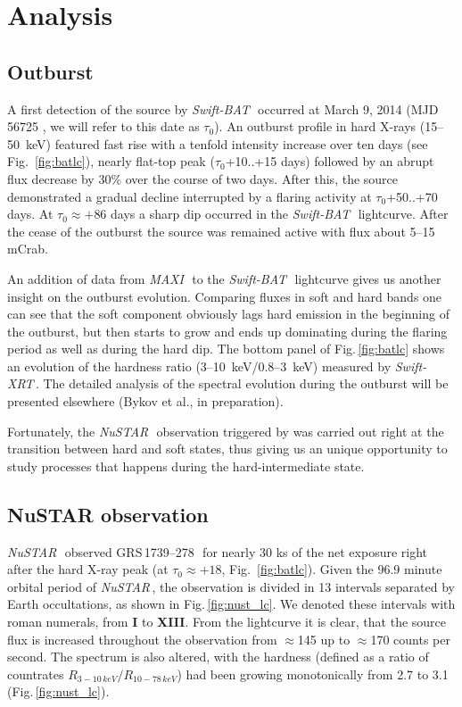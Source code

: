 \documentclass[a4paper,fleqn,usenatbib]{mnras}
\def\grs{{GRS\,1739--278\,}}
\def\swiftx{{\em Swift-XRT\,}}
\def\swiftb{{\em Swift-BAT\,}}
\def\nustar{{\em NuSTAR\,}}
\def\maxi{{\em MAXI\,}}
\begin{document}
\section{Analysis}
\subsection{Outburst}
A first detection of the source by \swiftb\, occurred at March 9, 2014 (MJD 56725 \citep{krimm14_atel}, we will refer to this date as $\tau_{0}$). 
An outburst profile in hard X-rays (15--50~keV) featured fast rise with a tenfold intensity increase over ten days (see Fig.~\ref{fig:batlc}), nearly flat-top peak ($\tau_{0}$+10..+15 days) followed by an abrupt flux decrease by 30\% over the course of two days.
After this, the source demonstrated a gradual decline interrupted by a flaring activity at $\tau_{0}$+50..+70 days. 
At $\tau_{0} \approx +86$ days a sharp dip occurred in the \swiftb\ lightcurve. 
After the cease of the outburst the source was remained active with flux about 5--15 mCrab. 

An addition of data from \maxi\, to the \swiftb\, lightcurve gives us another insight on the outburst evolution. 
Comparing fluxes in soft and hard bands one can see that the soft component obviously lags hard emission in the beginning of the outburst, but then starts to grow and ends up dominating during the flaring period as well as during the hard dip. 
The bottom panel of Fig.\,\ref{fig:batlc} shows an evolution of the hardness ratio (3--10~keV/0.8--3~keV) measured by \swiftx. 
The detailed analysis of the spectral evolution during the outburst will be presented elsewhere (Bykov et al., in preparation).

Fortunately, the \nustar\ observation triggered by \cite{miller15_nust} was carried out right at the transition between hard and soft states, thus giving us an unique opportunity to study processes that happens during the hard-intermediate state. 


\subsection{NuSTAR observation}
\label{sec:nust} 

\nustar\, observed \grs\ for nearly 30 ks of the net exposure right after the hard X-ray peak (at $\tau_{0}\approx+18$, Fig.~\ref{fig:batlc}). 
Given the 96.9 minute orbital period of \nustar, the observation is divided in 13 intervals separated by Earth occultations, as shown in Fig.\,\ref{fig:nust_lc}. 
We denoted these intervals with roman numerals, from {\bf I} to {\bf XIII}. 
From the lightcurve it is clear, that the source flux is increased throughout the observation from $\approx$145 up to $\approx$170 counts per second. 
The spectrum is also altered, with the hardness (defined as a ratio of countrates  $R_{3-10\,keV}/R_{10-78\,keV}$) had been growing monotonically from 2.7 to 3.1 (Fig.\,\ref{fig:nust_lc}). 
\end{document}
